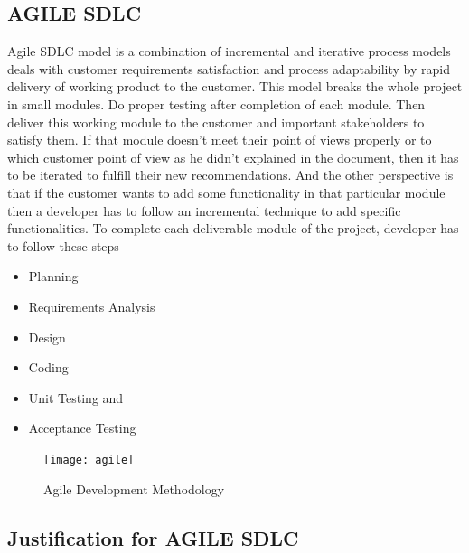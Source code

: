 \subsection{AGILE SDLC}
Agile SDLC model is a combination of incremental and iterative process models deals with customer requirements satisfaction and process adaptability by rapid delivery of working product to the customer. This model breaks the whole project in small modules. Do proper testing after completion of each module. Then deliver this working module to the customer and important stakeholders to satisfy them. If that module doesn’t meet their point of views properly or to which customer point of view as he didn’t explained in the document, then it has to be iterated to fulfill their new recommendations. And the other perspective is that if the customer wants to add some functionality in that particular module then a developer has to follow an incremental technique to add specific functionalities. 
To complete each deliverable module of the project, developer has to follow these steps
\begin{itemize}
\item Planning
\item Requirements Analysis
\item Design
\item Coding
\item Unit Testing and
\item Acceptance Testing
\end{itemize}

\begin{figure}[h]
\begin{center}
\texttt{[image: agile]}
\caption{Agile Development Methodology}
\label{fig:9}
\end{center}
\end{figure}
\subsection{Justification for AGILE SDLC}

